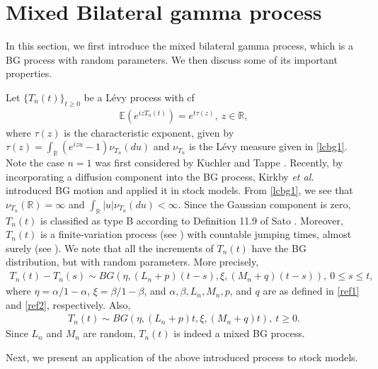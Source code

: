 \documentclass[12pt, a4paper,reqno]{amsart}
\theoremstyle{definition}
\theoremstyle{myremark}
\numberwithin{equation}{section}
\begin{document}
\section{Mixed Bilateral gamma process}\label{BGpro}
\noindent
In this section, we first introduce the mixed bilateral gamma process, which is a BG process with random parameters. We then discuss some of its important properties.

\noindent
Let $\{T_n(t)\}_{t\geq 0}$ be a L\'evy process with cf 
\begin{align}\label{cfBGRP}
	\mathbb{E}(e^{izT_n(t)})=e^{t \tau (z)},~z\in\mathbb{{R}},
\end{align}
\noindent
where $\tau(z)$ is the characteristic exponent, given by $\tau(z)=\int_{\mathbb{{R}}}(e^{izu}-1)\nu_{T_n}(du)$ and $\nu_{T_n}$ is the L\'evy measure given in \eqref{lcbg1}. Note the case $n=1$ was first considered by K$\ddot{\text{u}}$chler and Tappe \cite{bilateral0}. Recently, by incorporating a diffusion component into the BG process, Kirkby {\it et al.} \cite{bgm2024} introduced BG motion and applied it in stock models. From \eqref{lcbg1}, we see that $\nu_{T_n}(\mathbb{R})=\infty$ and $\int_{\mathbb{R}}|u| \nu_{T_n}(du)<\infty$. Since the Gaussian component is zero, $T_n(t)$ is classified as type B according to Definition 11.9 of Sato \cite{sato}. Moreover, $T_n(t)$ is a finite-variation process (see \cite[Theorem 21.9]{sato}) with countable jumping times, almost surely (see \cite[Theorem 21.3]{sato}). We note that all the increments of $T_n(t)$ have the BG distribution, but with random parameters. More precisely, 
\begin{align}\label{bgprorandom}
T_n(t) -T_n(s)\sim BG\left(\eta, (L_n+p)(t-s),\xi,(M_n+q)(t-s)\right),~0\leq s \leq t,	
\end{align}
\noindent
 where $\eta=\alpha/1-\alpha$, $\xi=\beta/1-\beta$, and $\alpha,\beta,L_n,M_n,p$, and $q$ are as defined in \eqref{ref1} and \eqref{ref2}, respectively. Also,
 \begin{align}\label{lcbgpro1}
T_n(t) \sim BG\left(\eta, (L_n+p)t,\xi,(M_n+q)t\right),~ t\geq 0.	
\end{align}
\noindent
Since $L_n$ and $M_n$ are random,  $T_n(t)$ is indeed a mixed BG process.

 \noindent
 Next, we present an application of the above introduced process to stock models.
 \vspace{-0.5cm}
\end{document}

